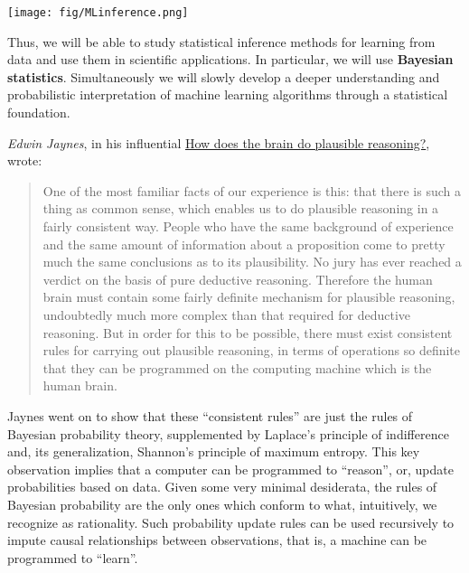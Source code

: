\documentclass[%
oneside,                 %
final,                   %
10pt]{article}
\begin{document}
\vspace{6mm}

\centerline{\texttt{[image: fig/MLinference.png]}}

\vspace{6mm}



Thus, we will be able to study statistical inference methods for learning from data and use them in scientific applications. In particular, we will use \textbf{Bayesian statistics}. Simultaneously we will slowly develop a deeper understanding and probabilistic interpretation of machine learning algorithms through a statistical foundation. 

\emph{Edwin Jaynes}, in his influential \href{{https://link.springer.com/chapter/10.1007%

\begin{quote}
One of the most familiar facts of our experience is this: that there is such a thing as common sense, which enables us to do plausible reasoning in a fairly consistent way. People who have the same background of experience and the same amount of information about a proposition come to pretty much the same conclusions as to its plausibility. No jury has ever reached a verdict on the basis of pure deductive reasoning. Therefore the human brain must contain some fairly definite mechanism for plausible reasoning, undoubtedly much more complex than that required for deductive reasoning. But in order for this to be possible, there must exist consistent rules for carrying out plausible reasoning, in terms of operations so definite that they can be programmed on the computing machine which is the human brain.
\end{quote}


Jaynes went on to show that these ``consistent rules'' are just the rules of Bayesian probability theory, supplemented by Laplace's principle of indifference and, its generalization, Shannon's principle of maximum entropy. This key observation implies that a computer can be programmed to ``reason'', or, update probabilities based on data. Given some very minimal desiderata, the rules of Bayesian probability are the only ones which conform to what, intuitively, we recognize as rationality. Such probability update rules can be used recursively to impute causal relationships between observations, that is, a machine can be programmed to ``learn''.
\end{document}
